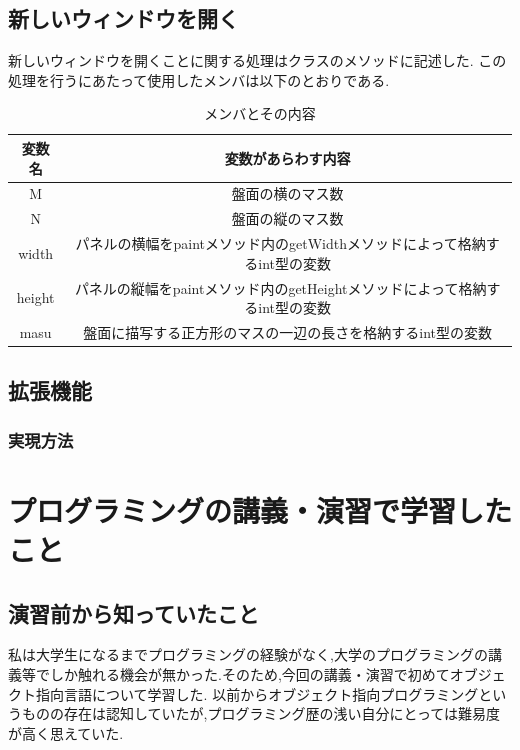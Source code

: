 \documentclass[dvipdfmx]{jarticle}
\begin{document}
\subsection{新しいウィンドウを開く}
新しいウィンドウを開くことに関する処理はクラスのメソッドに記述した.
この処理を行うにあたって使用したメンバは以下のとおりである.
\begin{table}[h]
  \centering
  \begin{tabular}{|c||c|}
    \hline
    変数名 & 変数があらわす内容\\
    \hline\hline
    M & 盤面の横のマス数\\\hline
    N & 盤面の縦のマス数\\\hline
    width & パネルの横幅をpaintメソッド内のgetWidthメソッドによって格納するint型の変数 \\\hline
    height & パネルの縦幅をpaintメソッド内のgetHeightメソッドによって格納するint型の変数\\\hline
    masu & 盤面に描写する正方形のマスの一辺の長さを格納するint型の変数\\\hline

  \end{tabular}
  \caption{メンバとその内容}
\end{table}



\subsection{拡張機能}


\subsubsection{実現方法}


\section{プログラミングの講義・演習で学習したこと}


\subsection{演習前から知っていたこと}

私は大学生になるまでプログラミングの経験がなく,大学のプログラミングの講義等でしか触れる機会が無かった.そのため,今回の講義・演習で初めてオブジェクト指向言語について学習した.
以前からオブジェクト指向プログラミングというものの存在は認知していたが,プログラミング歴の浅い自分にとっては難易度が高く思えていた.
\end{document}
